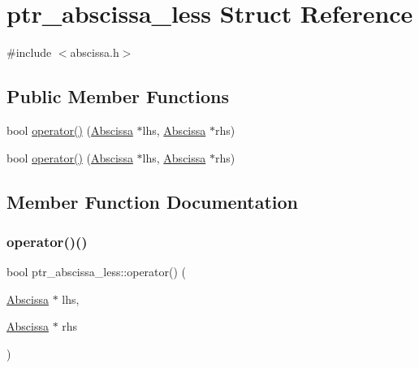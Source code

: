 \hypertarget{structptr__abscissa__less}{}\section{ptr\+\_\+abscissa\+\_\+less Struct Reference}
\label{structptr__abscissa__less}


{\ttfamily \#include $<$abscissa.\+h$>$}

\subsection*{Public Member Functions}
\begin{DoxyCompactItemize}
\item 
bool \mbox{\hyperlink{structptr__abscissa__less_a4c0f093567295405c4457fd24eeaadaa}{operator()}} (\mbox{\hyperlink{classAbscissa}{Abscissa}} $\ast$lhs, \mbox{\hyperlink{classAbscissa}{Abscissa}} $\ast$rhs)
\item 
bool \mbox{\hyperlink{structptr__abscissa__less_a4c0f093567295405c4457fd24eeaadaa}{operator()}} (\mbox{\hyperlink{classAbscissa}{Abscissa}} $\ast$lhs, \mbox{\hyperlink{classAbscissa}{Abscissa}} $\ast$rhs)
\end{DoxyCompactItemize}


\subsection{Member Function Documentation}
\mbox{\label{structptr__abscissa__less_a4c0f093567295405c4457fd24eeaadaa}} 
\subsubsection{\texorpdfstring{operator()()}{operator()()}\hspace{0.1cm}{\footnotesize\ttfamily [1/2]}}
{\footnotesize\ttfamily bool ptr\+\_\+abscissa\+\_\+less\+::operator() (\begin{DoxyParamCaption}\item[{\mbox{\hyperlink{classAbscissa}{Abscissa}} $\ast$}]{lhs,  }\item[{\mbox{\hyperlink{classAbscissa}{Abscissa}} $\ast$}]{rhs }\end{DoxyParamCaption})\hspace{0.3cm}{\ttfamily [inline]}}

